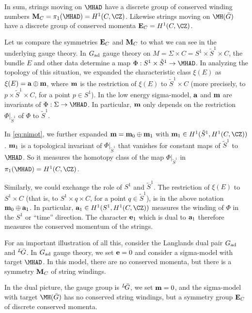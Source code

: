 In sum, strings moving on $\MHAD$ have a discrete group of
conserved winding numbers ${\bf M}_C=\pi_1(\MHAD)=H^1(C,\CZ)$.
Likewise strings moving on $\MHBARG$ have a discrete group of
conserved momenta ${\bf E}_C=H^1(C,\CZ)$.

Let us compare the symmetries ${\bf E}_C$ and ${\bf M}_C$ to what
we can see in the underlying gauge theory. In $G_{\rm{ad}}$ gauge
theory on $M=\Sigma\times C=S^1\times \tilde S^1\times C$, the
bundle $E$ and other data determine a map $\Phi:S^1\times \tilde
S^1\to \MHAD$. In analyzing the topology of this situation, we
expanded the characteristic class $\xi(E)$ as $\xi(E)={\bf
a}\oplus {\bf m}$, where ${\bf m}$ is the restriction of $\xi(E)$
to $\tilde S^1\times C$ (more precisely, to $p\times \tilde
S^1\times C$, for a point $p\in S^1$). In the low energy
sigma-model, ${\bf a}$ and ${\bf m}$ are invariants of
$\Phi:\Sigma\to \MHAD$. In particular, ${\bf m}$ only depends on
the restriction $\Phi|_{\tilde S^1}$ of $\Phi$ to $\tilde S^1$.

In \eqref{eq:nimot}, we further expanded ${\bf m}={\bf m}_0\oplus {\bf m}_1$
with ${\bf m}_1\in H^1(\tilde S^1,H^1(C,\CZ))$.  ${\bf m}_1$ is a
topological invariant of $\Phi|_{\tilde S^1}$ that  vanishes for
constant maps of $\tilde S^1$ to $\MHAD$. So it measures the
homotopy class of the map $\Phi|_{\tilde S^1}$ in
$\pi_1(\MHAD)=H^1(C,\CZ)$.

Similarly, we could exchange the role of $S^1$ and $\tilde S^1$.
The restriction of $\xi(E)$ to $S^1 \times C$ (that is, to
$S^1\times q\times C$, for a point $q\in \tilde S^1$), is in the
above notation ${\bf m}_0\oplus {\bf a}_1$. In particular, ${\bf
a}_1\in H^1(S^1,H^1(C,\CZ))$ measures the winding of $\Phi$ in the
$S^1$ or ``time'' direction. The character ${\bf e}_1$ which is
dual to ${\bf a}_1$ therefore measures the conserved momentum of
the strings.

\par{}

For an important illustration of all this, consider the Langlands
dual pair $G_{\rm{ad}}$ and $^L\negthinspace\bar G$.  In
$G_{\rm{ad}}$ gauge theory, we set ${\bf e}=0$ and consider a
sigma-model with target $\MHAD$.  In this model, there are no
conserved momenta, but there is a symmetry ${\bf M}_C$ of string
windings.

In the dual picture, the gauge group is $^L\negthinspace\bar G$,
we set ${\bf m}=0$, and the sigma-model with target $\MHBARG$ has
no conserved string windings, but a symmetry group ${\bf E}_C$ of
discrete conserved momenta.

